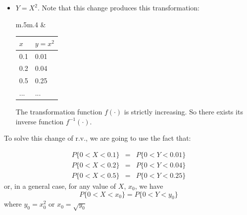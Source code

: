 \begin{itemize}
\item $ Y = X^2$. Note that this change produces this transformation:
\begin{center}
\begin{tabular}{m{}m{}}
  &
 \begin{tabular}{l|l}
$x$ & $y = x^2$ \\ \hline
0.1 & 0.01\\
0.2 & 0.04\\
0.5 & 0.25\\
... & ...\\
\end{tabular} 
\end{tabular}
\end{center}

The transformation function $f(\cdot)$ is strictly increasing. So there exists its inverse function $f^{-1}(\cdot)$.


\end{itemize}
To solve this change of r.v., we are going to use the fact that:

\begin{eqnarray}
P\{0<X<0.1\} &  = & P\{0<Y<0.01\}  \nonumber\\
P\{0<X<0.2\} &  = & P\{0<Y<0.04\}  \nonumber\\
P\{0<X<0.5\} &  = & P\{0<Y<0.25\}  \nonumber
\end{eqnarray}
or, in a general case, for any value of $X$, $x_0$, we have
$$ P\{0<X<x_0\}  = P\{0<Y<y_0\}$$
where $y_0=x_0^2$ or $x_0= \sqrt{y_0}$ 

